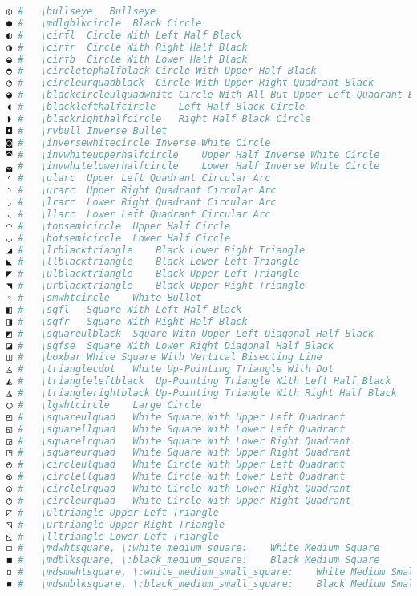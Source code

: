 \begin{lstlisting}[language=Julia, style=julia, linewidth=\textwidth]
◎ #   \bullseye   Bullseye
● #   \mdlgblkcircle  Black Circle
◐ #   \cirfl  Circle With Left Half Black
◑ #   \cirfr  Circle With Right Half Black
◒ #   \cirfb  Circle With Lower Half Black
◓ #   \circletophalfblack Circle With Upper Half Black
◔ #   \circleurquadblack  Circle With Upper Right Quadrant Black
◕ #   \blackcircleulquadwhite Circle With All But Upper Left Quadrant Black
◖ #   \blacklefthalfcircle    Left Half Black Circle
◗ #   \blackrighthalfcircle   Right Half Black Circle
◘ #   \rvbull Inverse Bullet
◙ #   \inversewhitecircle Inverse White Circle
◚ #   \invwhiteupperhalfcircle    Upper Half Inverse White Circle
◛ #   \invwhitelowerhalfcircle    Lower Half Inverse White Circle
◜ #   \ularc  Upper Left Quadrant Circular Arc
◝ #   \urarc  Upper Right Quadrant Circular Arc
◞ #   \lrarc  Lower Right Quadrant Circular Arc
◟ #   \llarc  Lower Left Quadrant Circular Arc
◠ #   \topsemicircle  Upper Half Circle
◡ #   \botsemicircle  Lower Half Circle
◢ #   \lrblacktriangle    Black Lower Right Triangle
◣ #   \llblacktriangle    Black Lower Left Triangle
◤ #   \ulblacktriangle    Black Upper Left Triangle
◥ #   \urblacktriangle    Black Upper Right Triangle
◦ #   \smwhtcircle    White Bullet
◧ #   \sqfl   Square With Left Half Black
◨ #   \sqfr   Square With Right Half Black
◩ #   \squareulblack  Square With Upper Left Diagonal Half Black
◪ #   \sqfse  Square With Lower Right Diagonal Half Black
◫ #   \boxbar White Square With Vertical Bisecting Line
◬ #   \trianglecdot   White Up-Pointing Triangle With Dot
◭ #   \triangleleftblack  Up-Pointing Triangle With Left Half Black
◮ #   \trianglerightblack Up-Pointing Triangle With Right Half Black
◯ #   \lgwhtcircle    Large Circle
◰ #   \squareulquad   White Square With Upper Left Quadrant
◱ #   \squarellquad   White Square With Lower Left Quadrant
◲ #   \squarelrquad   White Square With Lower Right Quadrant
◳ #   \squareurquad   White Square With Upper Right Quadrant
◴ #   \circleulquad   White Circle With Upper Left Quadrant
◵ #   \circlellquad   White Circle With Lower Left Quadrant
◶ #   \circlelrquad   White Circle With Lower Right Quadrant
◷ #   \circleurquad   White Circle With Upper Right Quadrant
◸ #   \ultriangle Upper Left Triangle
◹ #   \urtriangle Upper Right Triangle
◺ #   \lltriangle Lower Left Triangle
◻ #   \mdwhtsquare, \:white_medium_square:    White Medium Square
◼ #   \mdblksquare, \:black_medium_square:    Black Medium Square
◽ #   \mdsmwhtsquare, \:white_medium_small_square:    White Medium Small Square
◾ #   \mdsmblksquare, \:black_medium_small_square:    Black Medium Small Square

\end{lstlisting}
